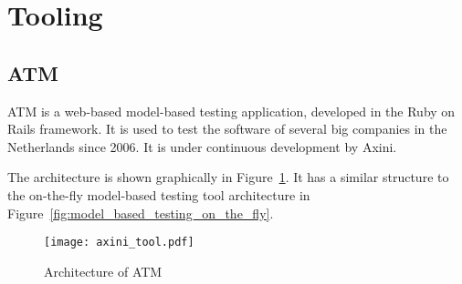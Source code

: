 \section{Tooling}\label{sec:tooling}

\subsection{ATM}\label{sec:descriptionaxini}
ATM is a web-based model-based testing application, developed in the Ruby on Rails framework. It is used to test the software of several big companies in the Netherlands since 2006. It is under continuous development by Axini.

The architecture is shown graphically in Figure~\ref{fig:axini_tool}. It has a similar structure to the on-the-fly model-based testing tool architecture in Figure~\ref{fig:model_based_testing_on_the_fly}.

\begin{figure}[ht]
  \begin{center}
    \texttt{[image: axini\_tool.pdf]}
  \end{center}
  \caption{Architecture of ATM}
  \label{fig:axini_tool}
\end{figure}

